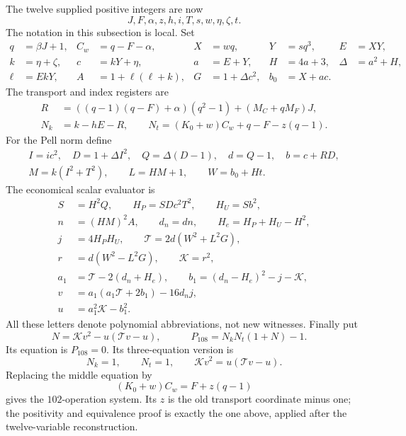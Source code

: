 The twelve supplied positive integers are now
\[
 J,F,\alpha,z,h,i,T,s,w,\eta,\zeta,t.
\]
The notation in this subsection is local.  Set
\begin{align*}
 q&=\beta J+1,& C_w&=q-F-\alpha,&X&=wq,&Y&=sq^3,&E&=XY,\\
 k&=\eta+\zeta,&c&=kY+\eta,&a&=E+Y,&H&=4a+3,&\Delta&=a^2+H,\\
 \ell&=EkY,&A&=1+\ell(\ell+k),&G&=1+\Delta c^2,&b_0&=X+ac.
\end{align*}
The transport and index registers are
\begin{align*}
 R&=((q-1)(q-F)+\alpha)(q^2-1)+(M_C+qM_F)J,\\
 N_k&=k-hE-R,\qquad
 N_t=(K_0+w)C_w+q-F-z(q-1).
\end{align*}
For the Pell norm define
\[
\begin{gathered}
 I=ic^2,\quad D=1+\Delta I^2,\quad Q=\Delta(D-1),\quad d=Q-1,
 \quad b=c+RD,\\
 M=k(I^2+T^2),\qquad L=HM+1,\qquad W=b_0+Ht.
\end{gathered}
\]
The economical scalar evaluator is
\begin{align*}
 S&=H^2Q,\qquad H_P=SDc^2T^2,\qquad H_U=Sb^2,\\
 n&=(HM)^2A,\qquad d_n=dn,\qquad H_e=H_P+H_U-H^2,\\
 j&=4H_PH_U,\qquad \mathcal T=2d(W^2+L^2G),\\
 r&=d(W^2-L^2G),\qquad\mathcal K=r^2,\\
 a_1&=\mathcal T-2(d_n+H_e),\qquad b_1=(d_n-H_e)^2-j-\mathcal K,\\
 v&=a_1(a_1\mathcal T+2b_1)-16d_nj,\\
 u&=a_1^2\mathcal K-b_1^2.
\end{align*}
All these letters denote polynomial abbreviations, not new witnesses.
Finally put
\begin{equation}
 N=\mathcal K v^2-u(\mathcal T v-u),\qquad
 \boxed{\quad P_{108}=N_kN_t(1+N)-1.\quad}
 \label{eq:p108}
\end{equation}
Its equation is $P_{108}=0$.  Its three-equation version is
\begin{equation}
 N_k=1,\qquad N_t=1,\qquad
 \mathcal K v^2=u(\mathcal T v-u).
 \label{eq:system103}
\end{equation}
Replacing the middle equation by
\begin{equation}
 (K_0+w)C_w=F+z(q-1)
 \label{eq:positive102transport}
\end{equation}
gives the $102$-operation system.  Its $z$ is the old transport coordinate
minus one; the positivity and equivalence proof is exactly the one above,
applied after the twelve-variable reconstruction.

